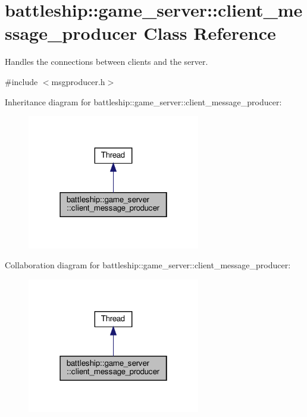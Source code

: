 \hypertarget{classbattleship_1_1game__server_1_1client__message__producer}{}\section{battleship\+:\+:game\+\_\+server\+:\+:client\+\_\+message\+\_\+producer Class Reference}
\label{classbattleship_1_1game__server_1_1client__message__producer}


Handles the connections between clients and the server.  




{\ttfamily \#include $<$msgproducer.\+h$>$}



Inheritance diagram for battleship\+:\+:game\+\_\+server\+:\+:client\+\_\+message\+\_\+producer\+:
\nopagebreak
\begin{figure}[H]
\begin{center}
\leavevmode
\includegraphics[width=214pt]{classbattleship_1_1game__server_1_1client__message__producer__inherit__graph}
\end{center}
\end{figure}


Collaboration diagram for battleship\+:\+:game\+\_\+server\+:\+:client\+\_\+message\+\_\+producer\+:
\nopagebreak
\begin{figure}[H]
\begin{center}
\leavevmode
\includegraphics[width=214pt]{classbattleship_1_1game__server_1_1client__message__producer__coll__graph}
\end{center}
\end{figure}
